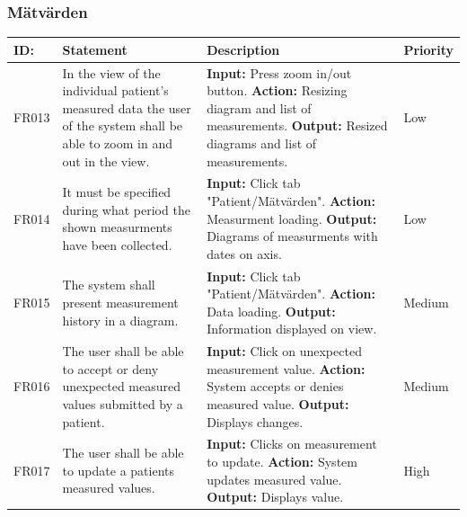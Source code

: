 \documentclass{scrreprt}
\begin{document}
\subsubsection{Mätvärden}
\begin{center}
\begin{tabularx}{\linewidth}{| l | X | X | l |}
\hline
\textbf{ID:} & \textbf{Statement} & \textbf{Description} & \textbf{Priority} \\ 
\hline
FR013 & In the view of the individual patient's measured data the user of the system shall be able to zoom in and out in the view.  & \textbf{Input:} Press zoom in/out button.
\newline \textbf{Action:} Resizing diagram and list of measurements.
\newline \textbf{Output:} Resized diagrams and list of measurements. & Low \\ 
\hline
FR014 & It must be specified during what period the shown measurments have been collected. & \textbf{Input:} Click tab "Patient/Mätvärden".
\newline \textbf{Action:} Measurment loading.
\newline \textbf{Output:} Diagrams of measurments with dates on axis. & Low \\ 
\hline
FR015 & The system shall present measurement history in a diagram. & \textbf{Input:} Click tab "Patient/Mätvärden".
\newline \textbf{Action:} Data loading.
\newline \textbf{Output:} Information displayed on view. & Medium \\ 
\hline
FR016 & The user shall be able to accept or deny unexpected measured values submitted by a patient.  & \textbf{Input:} Click on unexpected measurement value.
\newline \textbf{Action:} System accepts or denies measured value.
\newline \textbf{Output:} Displays changes. & Medium \\ 
\hline
FR017 & The user shall be able to update a patients measured values.  & \textbf{Input:} Clicks on measurement to update.
\newline \textbf{Action:} System updates measured value.
\newline \textbf{Output:} Displays value. & High \\ 
\hline
\end{tabularx}
\end{center}
\end{document}
